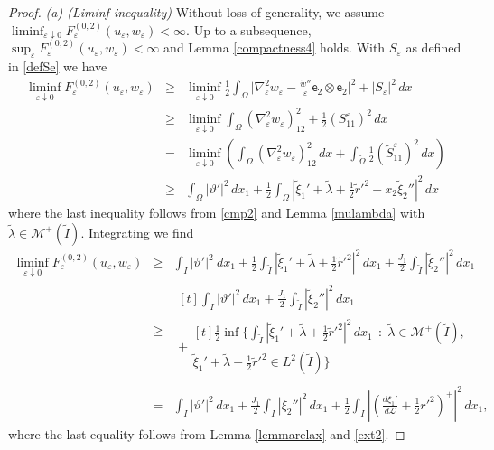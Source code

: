 \documentclass[a4, 11pt, reqno, final]{amsart}
\newcommand{\calL}{\mathcal{L}}
\newcommand{\calM}{\mathcal{M}}
\newcommand\e{\varepsilon}
\theoremstyle{plain}%
\DeclareMathOperator{\st}{\,:\,}
\begin{document}
	\begin{proof}
		{\it {(a) (Liminf inequality)}}
		Without loss of generality, we assume $\liminf_{\e\downarrow 0} F_{\e}^{(0,2)}(u_\e, w_\e) <\infty$. Up to a subsequence, $\sup_{\e}F_{\e}^{(0,2)}(u_\e, w_\e) <\infty$ and Lemma \ref{compactness4} holds.  With $S_\e$ as defined in \eqref{defSe} we have
		\begin{eqnarray*}
			\liminf_{\e\downarrow 0} F_{\e}^{(0,2)}(u_\e,w_\e)&\ge&
			\liminf_{\e\downarrow 0}\frac{1}{2}\int_\Omega \big| \nabla^2_\e w_\e- \frac{\mathring{w} ''}{\e} \mathsf{e}_2 \otimes \mathsf{e}_2\big|^2 +|S_\e|^2\, dx\\
			&\ge&
			\liminf_{\e\downarrow 0}\int_\Omega (\nabla^2_\e w_\e)_{12}^2+\frac{1}{2} (S^\e_{11})^2\, dx\\
			&=&
			\liminf_{\e\downarrow 0}(\int_\Omega (\nabla^2_\e w_\e)_{12}^2 \, dx+ \int_{\widetilde{\Omega}}\frac{1}{2} (\widetilde{S}^\e_{11})^2\, dx)\\
			&\ge&\int_\Omega |\vartheta'|^2 \, dx_1+\frac{1}{2} \int_{\widetilde{\Omega}}|\widetilde{\xi}_1' + \widetilde{\lambda} + \frac12 \widetilde{r}'^2 - x_2\widetilde{\xi}_2''|^2\, dx
		\end{eqnarray*}
		where the last inequality follows from \eqref{cmp2} and Lemma \ref{mulambda} with $\widetilde{\lambda} \in \calM^+(\widetilde{I})$. Integrating we find
		\begin{eqnarray*}
			\liminf_{\e\downarrow 0} F_{\e}^{(0,2)}(u_\e,w_\e)
			&\ge& \int_I |\vartheta'|^2 \ dx_1 + \frac12 \int_{\widetilde{I}}| \widetilde{\xi}_1' + \widetilde{\lambda} + \frac12 \widetilde{r}'^2 |^2 \,dx_1 + \frac{J_1}{2}\int_{\widetilde{I}} | \widetilde{\xi}_2'' |^2 \,dx_1\\
			&\ge& \begin{multlined}[t]\int_I |\vartheta'|^2 \,dx_1 + \frac{J_1}{2}\int_{\widetilde{I}} | \widetilde{\xi}_2'' |^2 \,dx_1 \\ + \begin{multlined}[t]\frac12\inf\{\int_{\widetilde{I}} | \widetilde{\xi}_1' + \widetilde{\lambda} + \frac12 \widetilde{r}'^2 |^2 \,dx_1 \st \widetilde{\lambda} \in \calM^+(\widetilde{I}), \\ \widetilde{\xi}_1' + \widetilde{\lambda} + \frac12 \widetilde{r}'^2 \in L^2(\widetilde{I}) \}\end{multlined} \end{multlined}\\
			&=& \int_I |\vartheta'|^2 \,dx_1 + \frac{J_1}{2}\int_I | \xi_2'' |^2 \,dx_1 + \frac12\int_I | (\frac{d\xi_1'}{d\calL} + \frac12 r'^2)^+ |^2 \,dx_1,
		\end{eqnarray*}
		where the last equality follows from Lemma \ref{lemmarelax} and \eqref{ext2}.


\end{proof}
\end{document}

